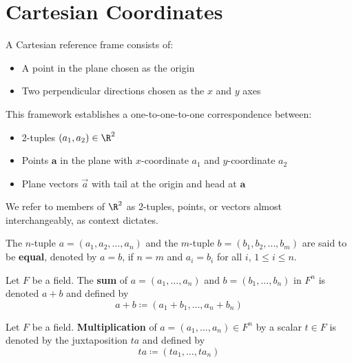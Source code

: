 \section{Cartesian Coordinates}


\begin{note}
    A Cartesian reference frame consists of:
    \begin{itemize}
        \item A point in the plane chosen as the origin
        \item Two perpendicular directions chosen as the $x$ and $y$ axes
    \end{itemize}
    This framework establishes a one-to-one-to-one correspondence between:
    \begin{itemize}
        \item 2-tuples $(a_1, a_2) \in \R^2$
        \item Points $\mathbf{a}$ in the plane with $x$-coordinate $a_1$ and $y$-coordinate $a_2$
        \item Plane vectors $\vec{a}$ with tail at the origin and head at $\mathbf{a}$
    \end{itemize}
    We refer to members of $\R^2$ as 2-tuples, points, or vectors almost interchangeably, as context dictates.
\end{note}



\begin{definition}\label{def:tuple-equality}
    The $n$-tuple $a = (a_1, a_2, \ldots, a_n)$ and the $m$-tuple $b = (b_1, b_2, \ldots, b_m)$ are said to be \textbf{equal}, denoted by $a = b$, if $n = m$ and $a_i = b_i$ for all $i$, $1 \leq i \leq n$.
\end{definition}

\begin{definition}\label{def:tuple-addition}
    Let $F$ be a field. The \textbf{sum} of $a = (a_1, \ldots, a_n)$ and $b = (b_1, \ldots, b_n)$ in $F^n$ is denoted $a + b$ and defined by
    \[
    a + b \coloneqq (a_1 + b_1, \ldots, a_n + b_n)
    \]
\end{definition}

\begin{definition}\label{def:scalar-mult}
    Let $F$ be a field. \textbf{Multiplication} of $a = (a_1, \ldots, a_n) \in F^n$ by a scalar $t \in F$ is denoted by the juxtaposition $ta$ and defined by
    \[
    ta \coloneqq (ta_1, \ldots, ta_n)
    \]
\end{definition}

